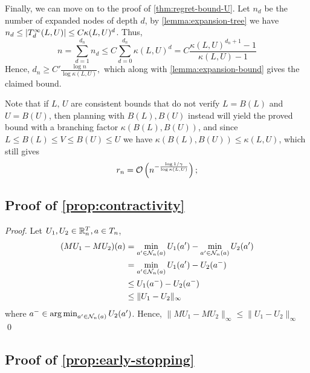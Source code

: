 \documentclass[runningheads]{llncs}
\begin{document}
Finally, we can move on to the proof of \autoref{thm:regret-bound-U}.
Let $n_d$ be the number of expanded nodes of depth $d$, by \autoref{lemma:expansion-tree} we have $n_d \leq |T^\infty_d(L,U)| \leq C\kappa(L,U)^d$. Thus, 
\[n = \sum_{d=1}^{d_n} n_d \leq C\sum_{d=0}^{d_n} \kappa(L,U)^d = C\frac{\kappa(L,U)^{d_n+1}-1}{\kappa(L,U)-1}\]
Hence, $d_n \geq C'\frac{\log n}{\log\kappa(L,U)},$ which along with \autoref{lemma:expansion-bound} gives the claimed bound.

Note that if $L,\,U$ are consistent bounds that do not verify $L = B(L)$ and $U=B(U)$, then planning with $B(L),B(U)$ instead will yield the proved bound with a branching factor $\kappa(B(L),B(U))$, and since $L\leq B(L)\leq V\leq B(U)\leq U$ we have $\kappa(B(L),B(U)) \leq \kappa(L,U)$, which still gives \begin{align*}
r_n = \mathcal{O}\left(n^{-\frac{\log 1/\gamma}{\log \kappa(L,U)}}\right);
\end{align*}

\subsection{Proof of \autoref{prop:contractivity}}
\begin{proof}
Let $U_1, U_2\in \mathbb{R}^T_n, a\in T_n$,
\begin{align*}
    (M U_1 - M U_2)(a) &= \min_{a'\in\mathcal{N}_n(a)} U_1(a') - \min_{a'\in\mathcal{N}_n(a)} U_2(a') \\
    &= \min_{a'\in\mathcal{N}_n(a)} U_1(a') - U_2(a^-) \\
    &\leq U_1(a^-) - U_2(a^-) \\
    &\leq \|U_1 - U_2\|_\infty
\end{align*}
where $a^-\in \operatorname*{arg\,min}_{a'\in\mathcal{N}_n(a)} U_2(a')$. 
Hence, $\|M U_1 - M U_2\|_\infty \leq \|U_1 - U_2\|_\infty$
\qed\end{proof}

\subsection{Proof of \autoref{prop:early-stopping}}
\end{document}
